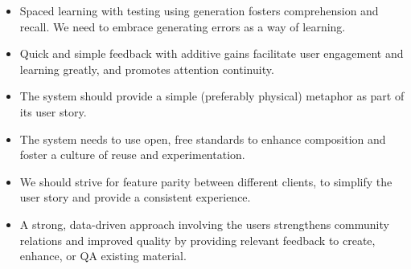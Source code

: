 \begin{itemize}
\item Spaced learning with testing using generation fosters comprehension and
recall. We need to embrace generating errors as a way of learning.
\item Quick and simple feedback with additive gains facilitate user engagement
and learning greatly, and promotes attention continuity.
\item The system should provide a simple (preferably physical) metaphor as part
of its user story.
\item The system needs to use open, free standards to enhance composition and
foster a culture of reuse and experimentation.
\item We should strive for feature parity between different clients, to simplify
the user story and provide a consistent experience.
\item A strong, data-driven approach involving the users strengthens community
relations and improved quality by providing relevant feedback to create,
enhance, or QA existing material.
\end{itemize}
